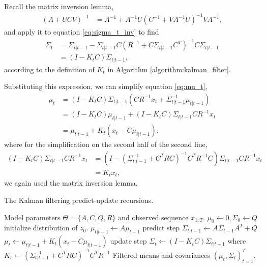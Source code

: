 \documentclass{article}
\begin{document}
Recall the matrix inversion lemma,
\begin{align*}
\left(A + UCV\right)^{-1} &= A^{-1} + A^{-1}U\left(C^{-1} + VA^{-1}U\right)^{-1}VA^{-1},
\end{align*}
and apply it to equation \ref{eq:sigma_t_inv} to find
\begin{align*}
  \Sigma_{t} &= \Sigma_{t \vert t - 1} - \Sigma_{t \vert t - 1}C\left(R^{-1} + C \Sigma_{t \vert t - 1}C^{T}\right)^{-1}C\Sigma_{t \vert t - 1} \\
  &= \left(I - K_{t}C\right)\Sigma_{t \vert t - 1},
\end{align*}
according to the definition of $K_{t}$ in Algorithm
\ref{algorithm:kalman_filter}.

Substituting this expression, we can simplify equation \ref{eq:mu_t},
\begin{align*}
  \mu_{t} &= \left(I - K_{t} C\right)\Sigma_{t \vert t - 1}\left(C R^{-1}x_{t} + \Sigma_{t \vert t - 1}^{-1} \mu_{t \vert t - 1}\right) \\
  &= \left(I - K_{t}C\right)\mu_{t \vert t - 1} + \left(I - K_{t} C\right)\Sigma_{t \vert t - 1}C R^{-1} x_{t} \\
  &= \mu_{t \vert t - 1} + K_{t}\left(x_{t} - C\mu_{t \vert t- 1}\right),
\end{align*}
where for the simplification on the second half of the second line,
\begin{align*}
  \left(I - K_{t}C\right)\Sigma_{t \vert t - 1} C R^{-1} x_{t} &= \left(I - \left(\Sigma_{t \vert t - 1}^{-1} + C^{T} R C\right)^{-1}C^{T}R^{-1}C\right)\Sigma_{t \vert t - 1}C R^{-1} x_{t} \\
  &= K_{t}x_{t},
\end{align*}
we again used the matrix inversion lemma.

\begin{algorithm}
   \caption{The Kalman filtering predict-update recursions.}
   \label{alg:kalman_filter}
\begin{algorithmic}
   Model parameters $\Theta = \{A, C, Q, R\}$ and
    observed sequence $x_{1:T}$.
    \STATE $\mu_{0} \leftarrow 0, \Sigma_{0} \leftarrow Q$ \hfill initialize distribution of
    $z_{0}$.
    \STATE $\mu_{t \vert t - 1} \leftarrow A\mu_{t - 1}$ \hfill predict step
    \STATE $\Sigma_{t \vert t - 1} \leftarrow A \Sigma_{t - 1} A^{T} + Q$
    \STATE $\mu_{t} \leftarrow \mu_{t \vert t - 1} + K_{t}\left(x_{t} - C\mu_{t \vert t - 1}\right)$ \hfill update step
    \STATE $\Sigma_{t} \leftarrow \left(I - K_{t}C\right)\Sigma_{t \vert t - 1}$
    \STATE where $K_{t} \leftarrow \left(\Sigma_{t \vert t - 1}^{-1} + C^{T}R C\right)^{-1} C^{T}R^{-1}$
    \ENDFOR
     Filtered means and covariances $\left(\mu_{t},
    \Sigma_{t}\right)_{t = 1}^{T}$.
\end{algorithmic}
\end{algorithm}
\end{document}
